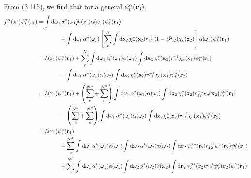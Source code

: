 \documentclass[a4paper]{book}
\newcounter{solution}[chapter]
\newcommand*{\dif}{\mathop{}\!\mathrm{d}}
\newcommand{\bfr}{{\bf r}}
\newcommand{\bfx}{{\bf x}}
\begin{document}
	\begin{solution}
	
	From (3.115), we find that for a general $\psi^\alpha_i( \bfr_1 )$,
	\begin{align*}
		f^\alpha( \bfx_1 ) \psi^\alpha_i( \bfr_1 ) &= \int \dif \omega_1 \, \alpha^*( \omega_1 ) h( \bfr_1) \alpha( \omega_1 ) \psi_i^\alpha( \bfr_1 ) \\
		&\hspace{4em} + \int \dif \omega_1 \, \alpha^*( \omega_1 ) \left[ \sum_c^N \int \dif \bfx_2 \, \chi^*_c( \bfx_2 ) r^{-1}_{12} ( 1 - \mathscr{P}_{12} ) \chi_c ( \bfx_2 ) \right] \alpha( \omega_1 ) \psi_i^\alpha( \bfr_1 ) \\
		&= h( \bfr_1 ) \psi^\alpha_i( \bfr_1) + \sum_c^N \int \dif \omega_1 \, \alpha^*( \omega_1 ) \alpha( \omega_1 ) \int \dif \bfx_2 \, \chi^*_c( \bfx_2 ) r^{-1}_{12} \chi_c ( \bfx_2 ) \psi^\alpha_i( \bfr_1 ) \\
		&\hspace{4em} - \int \dif \omega_1 \, \alpha^*( \omega_1 ) \alpha( \omega_2 ) \int \dif \bfx_2 \chi^*_c( \bfx_2 ) r^{-1}_{12} \chi_c ( \bfx_1 ) \psi^\alpha_i( \bfr_2 ) \\
		&= h( \bfr_1 ) \psi^\alpha_i( \bfr_1) + \left(  \sum_c^{N^\alpha} + \sum_c^{N^\beta} \right) \int \dif \omega_1 \, \alpha^*( \omega_1 ) \alpha( \omega_1 ) \int \dif \bfx_2 \, \chi^*_c( \bfx_2 ) r^{-1}_{12} \chi_c ( \bfx_2 ) \psi^\alpha_i( \bfr_1 )  \\
		&\hspace{4em} - \left( \sum_c^{N^\alpha} + \sum_c^{N^\beta} \right) \int \dif \omega_1 \, \alpha^*( \omega_1 ) \alpha( \omega_2 ) \int \dif \bfx_2 \chi^*_c( \bfx_2 ) r^{-1}_{12} \chi_c ( \bfx_1 ) \psi^\alpha_i( \bfr_2 ) \\
		&= h( \bfr_1 ) \psi^\alpha_i( \bfr_1) \\
		&\hspace{4em} + \sum_c^{N^\alpha} \int \dif \omega_1 \, \alpha^*( \omega_1 ) \alpha( \omega_1 ) \int \dif \omega_2 \, \alpha^*( \omega_2 ) \alpha( \omega_2 ) \int \dif \bfr_2 \, \psi^{\alpha*}_c( \bfr_2 )  r^{-1}_{12} \psi^{\alpha}_c ( \bfr_2 )  \psi^\alpha_i( \bfr_1 )  \\
		&\hspace{4em} + \sum_c^{N^\beta} \int \dif \omega_1 \, \alpha^*( \omega_1 ) \alpha( \omega_1 ) \int \dif \omega_2 \, \beta^*( \omega_2 )  \beta( \omega_2 ) \int \dif \bfr_2 \, \psi^{\beta*}_c( \bfr_2 )  r^{-1}_{12} \psi^{\beta}_c ( \bfr_2 ) \psi^\alpha_i( \bfr_1 )  \\

\end{align*}
\end{solution}
\end{document}
